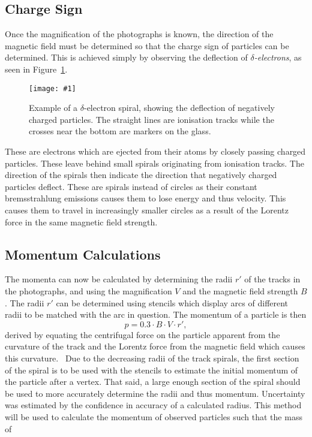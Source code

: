 \documentclass[twocolumn]{article}
\newcommand{\insertFigure}[1]{%
   \texttt{[image: \#1]}%
}
\begin{document}
\subsection{Charge Sign}
Once the magnification of the photographs is known, the direction of the magnetic field must be determined so that the charge sign of particles can be determined. This is achieved simply by observing the deflection of \textit{$\delta$-electrons}, as seen in Figure~\ref{fig:delta}. 
\begin{figure}[!h]
	\centering
	\insertFigure{delta.png}
	\caption{Example of a $\delta$-electron spiral, showing the deflection of negatively charged particles. The straight lines are ionisation tracks while the crosses near the bottom are markers on the glass.~\cite{delta}}
	\label{fig:delta}
\end{figure}
These are electrons which are ejected from their atoms by closely passing charged particles. These leave behind small spirals originating from ionisation tracks. The direction of the spirals then indicate the direction that negatively charged particles deflect. These are spirals instead of circles as their constant bremsstrahlung emissions causes them to lose energy and thus velocity. This causes them to travel in increasingly smaller circles as a result of the Lorentz force in the same magnetic field strength. 

\subsection{Momentum Calculations}
The momenta can now be calculated by determining the radii $r'$ of the tracks in the photographs, and using the magnification $V$ and the magnetic field strength $B$. The radii $r'$ can be determined using stencils which display arcs of different radii to be matched with the arc in question. The momentum of a particle is then
\begin{equation} \label{eq:mom}
p = 0.3\cdot B\cdot V \cdot r',
\end{equation}
derived by equating the centrifugal force on the particle apparent from the curvature of the track and the Lorentz force from the magnetic field which causes this curvature.~\cite{seul} Due to the decreasing radii of the track spirals, the first section of the spiral is to be used with the stencils to estimate the initial momentum of the particle after a vertex. That said, a large enough section of the spiral should be used to more accurately determine the radii and thus momentum. Uncertainty was estimated by the confidence in accuracy of a calculated radius. This method will be used to calculate the momentum of observed particles such that the mass of 
\end{document}
